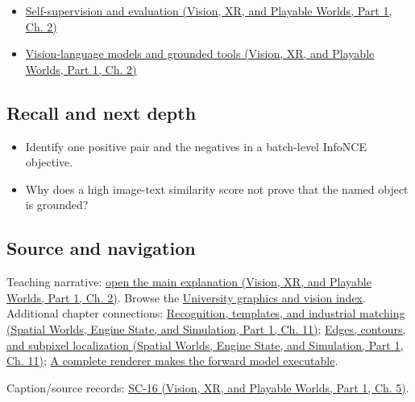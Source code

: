 \hypertarget{appendix-772f1fd96148-full-teaching-explanation}{}

\begin{itemize}
\tightlist
\item
  \href{../07-Vision-XR-and-Playable-Worlds-P01/main.pdf\#nameddest=04-visual-computing-ii-ch031-self-supervision-and-evaluation}{Self-supervision and evaluation (Vision, XR, and Playable Worlds, Part 1, Ch. 2)}
\item
  \href{../07-Vision-XR-and-Playable-Worlds-P01/main.pdf\#nameddest=04-visual-computing-ii-ch031-vision-language-models-and-grounded-tools}{Vision-language models and grounded tools (Vision, XR, and Playable Worlds, Part 1, Ch. 2)}
\end{itemize}

\subsection{Recall and next depth}\label{appendix-772f1fd96148-recall-and-next-depth}

\hypertarget{appendix-772f1fd96148-recall-and-next-depth}{}

\begin{itemize}
\tightlist
\item
  Identify one positive pair and the negatives in a batch-level InfoNCE objective.
\item
  Why does a high image-text similarity score not prove that the named object is grounded?
\end{itemize}

\subsection{Source and navigation}\label{appendix-772f1fd96148-source-and-navigation}

\hypertarget{appendix-772f1fd96148-source-and-navigation}{}

Teaching narrative: \href{../07-Vision-XR-and-Playable-Worlds-P01/main.pdf\#nameddest=04-visual-computing-ii-ch031-self-supervision-and-evaluation}{open the main explanation (Vision, XR, and Playable Worlds, Part 1, Ch. 2)}. Browse the \hyperref[appendix-a6d556a4ef50-university-graphics-vision-and-photography---independent-series]{University graphics and vision index}. Additional chapter connections: \href{../05-Spatial-Worlds-Engine-State-and-Simulation-P01/main.pdf\#nameddest=04-visual-computing-ii-ch030-recognition-templates-and-industrial-matching}{Recognition, templates, and industrial matching (Spatial Worlds, Engine State, and Simulation, Part 1, Ch. 11)}; \href{../05-Spatial-Worlds-Engine-State-and-Simulation-P01/main.pdf\#nameddest=04-visual-computing-ii-ch030-edges-contours-and-subpixel-localization}{Edges, contours, and subpixel localization (Spatial Worlds, Engine State, and Simulation, Part 1, Ch. 11)}; \hyperref[04-visual-computing-ii-ch035-a-complete-renderer-makes-the-forward-model-executable]{A complete renderer makes the forward model executable}.

Caption/source records: \href{../07-Vision-XR-and-Playable-Worlds-P01/main.pdf\#nameddest=04-visual-computing-ii-ch036-sc-16---stanford-cs231n-deep-learning-for-computer-vision-spring-2025-lecture-16-vision-and-language}{SC-16 (Vision, XR, and Playable Worlds, Part 1, Ch. 5)}.
